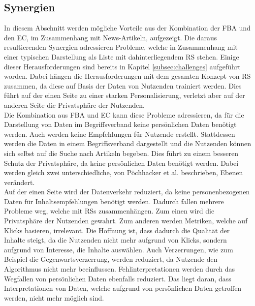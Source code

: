 \subsection{Synergien}\label{subsec:synergies}
In diesem Abschnitt werden mögliche Vorteile aus der Kombination der \ac{FBA} und den \ac{EC}, im Zusammenhang mit News-Artikeln, aufgezeigt.
Die daraus resultierenden Synergien adressieren Probleme, welche in Zusammenhang mit einer typischen Darstellung als Liste mit dahinterliegendem \ac{RS} stehen.
Einige dieser Herausforderungen sind bereits in Kapitel \ref{subsec:challenges} aufgeführt worden.
Dabei hängen die Herausforderungen mit dem gesamten Konzept von \ac{RS} zusammen, da diese auf Basis der Daten von Nutzenden trainiert werden.
Dies führt auf der einen Seite zu einer starken Personalisierung, verletzt aber auf der anderen Seite die Privatsphäre der Nutzenden.\\

Die Kombination aus \ac{FBA} und \ac{EC} kann diese Probleme adressieren, da für die Darstellung von Daten im Begriffsverband keine persönlichen Daten benötigt werden.
Auch werden keine Empfehlungen für Nutzende erstellt.
Stattdessen werden die Daten in einem Begriffsverband dargestellt und die Nutzenden können sich selbst auf die Suche nach Artikeln begeben.
Dies führt zu einem besseren Schutz der Privatsphäre, da keine persönlichen Daten benötigt werden.
Dabei werden gleich zwei unterschiedliche, von Pöchhacker et al. beschrieben, Ebenen verändert.\\

Auf der einen Seite wird der Datenverkehr reduziert, da keine personenbezogenen Daten für Inhaltsempfehlungen benötigt werden.
Dadurch fallen mehrere Probleme weg, welche mit \acp{RS} zusammenhängen.
Zum einen wird die Privatsphäre der Nutzenden gewahrt.
Zum anderen werden Metriken, welche auf Klicks basieren, irrelevant.
Die Hoffnung ist, dass dadurch die Qualität der Inhalte steigt, da die Nutzenden nicht mehr aufgrund von Klicks, sondern aufgrund von Interesse, die Inhalte auswählen.
Auch Verzerrungen, wie zum Beispiel die Gegenwartsverzerrung, werden reduziert, da Nutzende den Algorithmus nicht mehr beeinflussen.
Fehlinterpretationen werden durch das Wegfallen von persönlichen Daten ebenfalls reduziert.
Das liegt daran, dass Interpretationen von Daten, welche aufgrund von persönlichen Daten getroffen werden, nicht mehr möglich sind. \\

